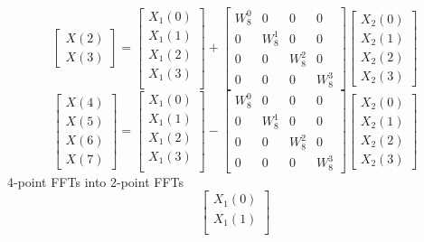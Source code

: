\documentclass[journal,12pt,twocolumn]{IEEEtran}
\renewcommand\thesection{\arabic{section}}
\begin{document}
\begin{enumerate}[label=\thesection.\arabic*]
\begin{equation}
\begin{bmatrix}
X(2) \\ 
X(3)
\end{bmatrix}
=
\begin{bmatrix}
X_{1}(0) \\ 
X_{1}(1)\\ 
X_{1}(2)\\
X_{1}(3)\\
\end{bmatrix}
+
\begin{bmatrix}
W^{0}_{8} & 0 & 0 & 0\\
0 & W^{1}_{8} & 0 & 0\\
0 & 0 & W^{2}_{8} & 0\\
0 & 0 & 0 & W^{3}_{8}
\end{bmatrix}
\begin{bmatrix}
X_{2}(0) \\ 
X_{2}(1) \\ 
X_{2}(2) \\
X_{2}(3)
\end{bmatrix}
\end{equation}
\begin{equation}
\begin{bmatrix}
X(4) \\ 
X(5) \\ 
X(6) \\ 
X(7)
\end{bmatrix}
=
\begin{bmatrix}
X_{1}(0) \\ 
X_{1}(1)\\ 
X_{1}(2)\\
X_{1}(3)\\
\end{bmatrix}
-
\begin{bmatrix}
W^{0}_{8} & 0 & 0 & 0\\
0 & W^{1}_{8} & 0 & 0\\
0 & 0 & W^{2}_{8} & 0\\
0 & 0 & 0 & W^{3}_{8}
\end{bmatrix}
\begin{bmatrix}
X_{2}(0) \\ 
X_{2}(1) \\ 
X_{2}(2) \\
X_{2}(3)
\end{bmatrix}
\end{equation}
4-point FFTs into 2-point FFTs
\begin{equation}
\begin{bmatrix}
X_{1}(0) \\ 
X_{1}(1)\\ 

\end{bmatrix}
\end{equation}
\end{enumerate}
\end{document}
